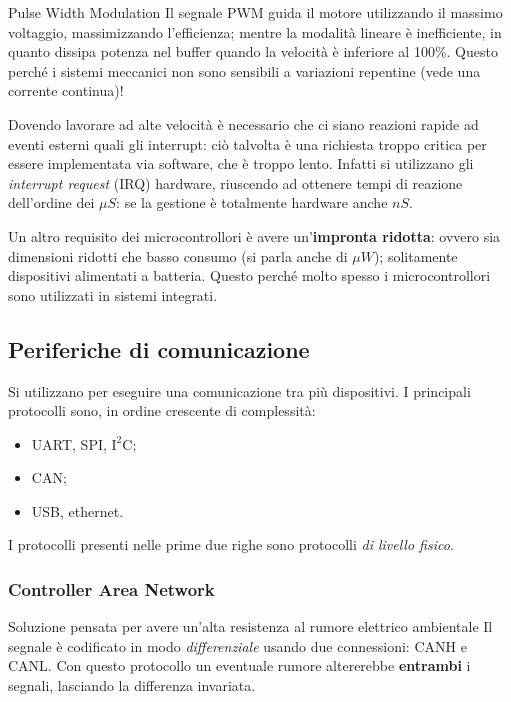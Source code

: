 \documentclass[
]{book}
\providecommand{\tightlist}{%
  \setlength{\itemsep}{0pt}\setlength{\parskip}{0pt}}
\begin{document}
\begin{redbox}{Pulse Width Modulation}
Il segnale PWM guida il motore utilizzando il massimo voltaggio,
massimizzando l'efficienza; mentre la modalità lineare è inefficiente,
in quanto dissipa potenza nel buffer quando la velocità è inferiore al
100\%. Questo perché i sistemi meccanici non sono sensibili a variazioni
repentine (vede una corrente continua)!
\end{redbox}

Dovendo lavorare ad alte velocità è necessario che ci siano reazioni
rapide ad eventi esterni quali gli interrupt: ciò talvolta è una
richiesta troppo critica per essere implementata via software, che è
troppo lento. Infatti si utilizzano gli \emph{interrupt request} (IRQ)
hardware, riuscendo ad ottenere tempi di reazione dell'ordine dei
\(\mu S\): se la gestione è totalmente hardware anche \(nS\).

Un altro requisito dei microcontrollori è avere un'\textbf{impronta
ridotta}: ovvero sia dimensioni ridotti che basso consumo (si parla
anche di \(\mu W\)); solitamente dispositivi alimentati a batteria.
Questo perché molto spesso i microcontrollori sono utilizzati in sistemi
integrati.

\subsection{Periferiche di
comunicazione}\label{periferiche-di-comunicazione}

Si utilizzano per eseguire una comunicazione tra più dispositivi. I
principali protocolli sono, in ordine crescente di complessità:

\begin{itemize}
\tightlist
\item
  UART, SPI, \(\text{I}^2\text{C}\);
\item
  CAN;
\item
  USB, ethernet.
\end{itemize}

I protocolli presenti nelle prime due righe sono protocolli \emph{di
livello fisico}.

\subsubsection{Controller Area Network}\label{controller-area-network}

Soluzione pensata per avere un'alta resistenza al rumore elettrico
ambientale \newline Il segnale è codificato in modo \emph{differenziale}
usando due connessioni: CANH e CANL. Con questo protocollo un eventuale
rumore altererebbe \textbf{entrambi} i segnali, lasciando la differenza
invariata.
\end{document}
